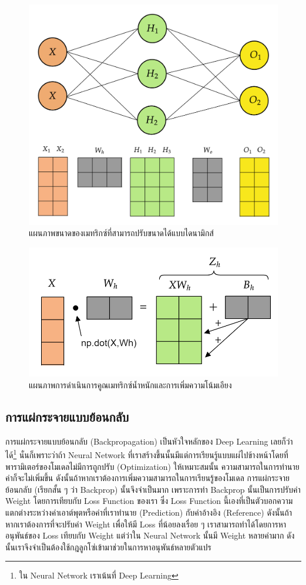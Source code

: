 \begin{figure}[H]
    \centering
    \includegraphics[width=0.65\linewidth]{fig/nn_feedforward_dyn_resizing.png}
    \caption{แผนภาพขนาดของเมทริกซ์ที่สามารถปรับขนาดได้แบบไดนามิกส์}
    \label{fig:nn_ff_dyn_resize}
\end{figure}

\begin{figure}[H]
    \centering
    \includegraphics[width=0.6\linewidth]{fig/nn_feedforward_matrix_weighted_input.png}
    \caption{แผนภาพการดำเนินการคูณเมทริกซ์น้ำหนักและการเพิ่มความโน้มเอียง}
    \label{fig:nn_ff_mat_w}
\end{figure}

\subsection{การแผ่กระจายแบบย้อนกลับ}
\label{ssec:backprop}

การแผ่กระจายแบบย้อนกลับ (Backpropagation) เป็นหัวใจหลักของ Deep Learning เลยก็ว่าได้\footnote{ใน Neural Network เราเน้นที่ Deep Learning} นั่นก็เพราะว่าถ้า Neural Network ที่เราสร้างขึ้นนั้นมีแต่การเรียนรู้แบบแผ่ไปข้างหน้าโดยที่พารามิเตอร์ของโมเดลไม่มีการถูกปรับ (Optimization) ให้เหมาะสมนั้น ความสามารถในการทำนายค่าก็จะไม่เพิ่มขึ้น ดังนั้นถ้าหากเราต้องการเพิ่มความสามารถในการเรียนรู้ของโมเดล การแผ่กระจายย้อนกลับ (เรียกสั้น ๆ ว่า Backprop) นั้นจึงจำเป็นมาก เพราะการทำ Backprop นั้นเป็นการปรับค่า Weight โดยการเทียบกับ Loss Function ของเรา ซึ่ง Loss Function นี้เองที่เป็นตัวบอกความแตกต่างระหว่างค่าเอาต์พุตหรือค่าที่เราทำนาย (Prediction) กับค่าอ้างอิง (Reference) ดังนั้นถ้าหากเราต้องการที่จะปรับค่า Weight เพื่อให้มี Loss ที่น้อยลงเรื่อย ๆ เราสามารถทำได้โดยการหาอนุพันธ์ของ Loss เทียบกับ Weight แต่ว่าใน Neural Network นั้นมี Weight หลายค่ามาก ดังนั้นเราจึงจำเป็นต้องใช้กฎลูกโซ่เข้ามาช่วยในการหาอนุพันธ์หลายตัวแปร

